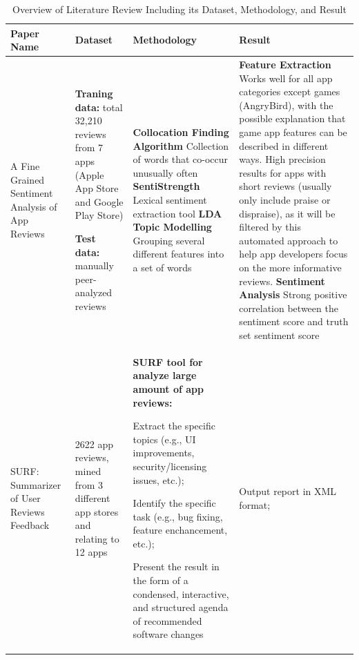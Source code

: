 \documentclass[12pt]{article}
\begin{document}
\begin{table}
\caption{Overview of Literature Review Including its Dataset, Methodology, and Result}
\begin{tabular}{|p{2cm}|p{2cm}|p{4cm}|p{5cm}|}
\hline
\centering
Paper Name & Dataset & Methodology & Result \\
\hline
A Fine Grained Sentiment Analysis of App Reviews \cite{fine_grained}
& 
\textbf{Traning data:}
\newline
total 32,210 reviews from 7 apps (Apple App Store and Google Play Store)
\newline

\textbf{Test data: }
\newline
2800 manually peer-analyzed reviews
& 
\textbf{Collocation Finding Algorithm}\newline
Collection of words that co-occur unusually often
\newline\newline
\textbf{SentiStrength}\newline
Lexical sentiment extraction tool
\newline\newline
\textbf{LDA Topic Modelling}\newline
Grouping several different features into a set of words
&
\textbf{Feature Extraction}\newline
Works well for all app categories except games (AngryBird), with the possible explanation that game app features can be described in different ways.\newline
High precision results for apps with short reviews (usually only include praise or dispraise), as it will be filtered by this automated approach to help app developers focus on the more informative reviews.
\newline\newline
\textbf{Sentiment Analysis}\newline
Strong positive correlation between the sentiment score and truth set sentiment score
\\
\hline
SURF: Summarizer of User Reviews Feedback \cite{surf}
&
2622 app reviews, mined from 3 different app stores and relating to 12 apps
&
\textbf{SURF tool for analyze large amount of app reviews:}

Extract the specific topics (e.g., UI improvements, security/licensing issues, etc.);

Identify the specific task (e.g., bug fixing, feature enchancement, etc.);

Present the result in the form of a condensed, interactive, and structured agenda of recommended software changes
&
Output report in XML format;


\end{tabular}
\end{table}
\end{document}
